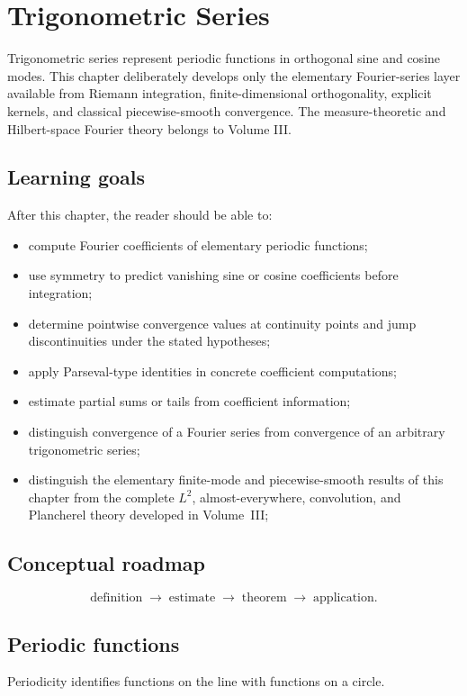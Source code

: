 \chapter{Trigonometric Series}
\label{ch:ii14}

Trigonometric series represent periodic functions in orthogonal sine and cosine modes. This chapter deliberately develops only the elementary Fourier-series layer available from Riemann integration, finite-dimensional orthogonality, explicit kernels, and classical piecewise-smooth convergence. The measure-theoretic and Hilbert-space Fourier theory belongs to Volume III.

\section*{Learning goals}
After this chapter, the reader should be able to:
\begin{itemize}
\item compute Fourier coefficients of elementary periodic functions;
\item use symmetry to predict vanishing sine or cosine coefficients before integration;
\item determine pointwise convergence values at continuity points and jump discontinuities under the stated hypotheses;
\item apply Parseval-type identities in concrete coefficient computations;
\item estimate partial sums or tails from coefficient information;
\item distinguish convergence of a Fourier series from convergence of an arbitrary trigonometric series;
\item distinguish the elementary finite-mode and piecewise-smooth results of this chapter from the complete $L^2$, almost-everywhere, convolution, and Plancherel theory developed in Volume~III;
\end{itemize}
\section*{Conceptual roadmap}
\[
\boxed{\text{definition}\;\longrightarrow\;\text{estimate}\;\longrightarrow\;\text{theorem}\;\longrightarrow\;\text{application}.}
\]

\section{Periodic functions}
Periodicity identifies functions on the line with functions on a circle.


